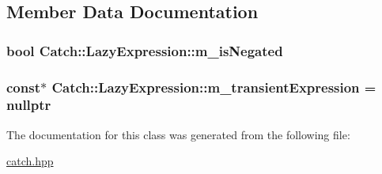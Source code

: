 \subsection{Member Data Documentation}
\hypertarget{class_catch_1_1_lazy_expression_a975fdfe2bb139512024bb479d478425e}{
\subsubsection[{m\-\_\-is\-Negated}]{\setlength{\rightskip}{0pt plus 5cm}bool Catch\-::\-Lazy\-Expression\-::m\-\_\-is\-Negated\hspace{0.3cm}{\ttfamily [private]}}}\label{class_catch_1_1_lazy_expression_a975fdfe2bb139512024bb479d478425e}
\hypertarget{class_catch_1_1_lazy_expression_a5a9ce4c2401a262c21b4e107551180bc}{
\subsubsection[{m\-\_\-transient\-Expression}]{ const$\ast$ Catch\-::\-Lazy\-Expression\-::m\-\_\-transient\-Expression = nullptr\hspace{0.3cm}{\ttfamily [private]}}}\label{class_catch_1_1_lazy_expression_a5a9ce4c2401a262c21b4e107551180bc}


The documentation for this class was generated from the following file\-:\begin{DoxyCompactItemize}
\item 
\hyperlink{catch_8hpp}{catch.\-hpp}\end{DoxyCompactItemize}
